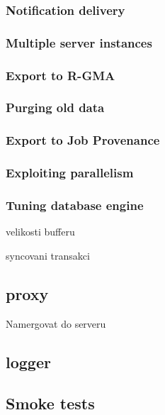 \subsubsection{Notification delivery}

\subsubsection{Multiple server instances}

\subsubsection{Export to R-GMA}

\subsubsection{Purging old data}


\subsubsection{Export to Job Provenance}


\subsubsection{Exploiting parallelism}

\subsubsection{Tuning database engine}


velikosti bufferu

syncovani transakci


\subsection{\LB proxy}

Namergovat do serveru

\subsection{\LB logger}


\subsection{Smoke tests}

